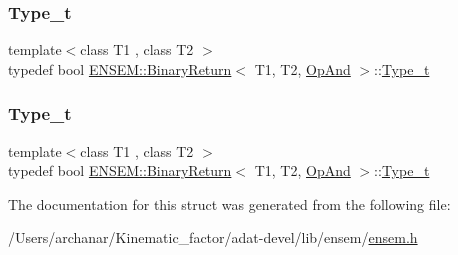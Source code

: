 \mbox{\label{structENSEM_1_1BinaryReturn_3_01T1_00_01T2_00_01OpAnd_01_4_a1efceffe0a3869bf85b2fa8d9b578978}} 
\subsubsection{\texorpdfstring{Type\_t}{Type\_t}\hspace{0.1cm}{\footnotesize\ttfamily [2/3]}}
{\footnotesize\ttfamily template$<$class T1 , class T2 $>$ \\
typedef bool \mbox{\hyperlink{structENSEM_1_1BinaryReturn}{E\+N\+S\+E\+M\+::\+Binary\+Return}}$<$ T1, T2, \mbox{\hyperlink{structENSEM_1_1OpAnd}{Op\+And}} $>$\+::\mbox{\hyperlink{structENSEM_1_1BinaryReturn_3_01T1_00_01T2_00_01OpAnd_01_4_a1efceffe0a3869bf85b2fa8d9b578978}{Type\+\_\+t}}}

\mbox{\label{structENSEM_1_1BinaryReturn_3_01T1_00_01T2_00_01OpAnd_01_4_a1efceffe0a3869bf85b2fa8d9b578978}} 
\subsubsection{\texorpdfstring{Type\_t}{Type\_t}\hspace{0.1cm}{\footnotesize\ttfamily [3/3]}}
{\footnotesize\ttfamily template$<$class T1 , class T2 $>$ \\
typedef bool \mbox{\hyperlink{structENSEM_1_1BinaryReturn}{E\+N\+S\+E\+M\+::\+Binary\+Return}}$<$ T1, T2, \mbox{\hyperlink{structENSEM_1_1OpAnd}{Op\+And}} $>$\+::\mbox{\hyperlink{structENSEM_1_1BinaryReturn_3_01T1_00_01T2_00_01OpAnd_01_4_a1efceffe0a3869bf85b2fa8d9b578978}{Type\+\_\+t}}}



The documentation for this struct was generated from the following file\+:\begin{DoxyCompactItemize}
\item 
/\+Users/archanar/\+Kinematic\+\_\+factor/adat-\/devel/lib/ensem/\mbox{\hyperlink{adat-devel_2lib_2ensem_2ensem_8h}{ensem.\+h}}\end{DoxyCompactItemize}
